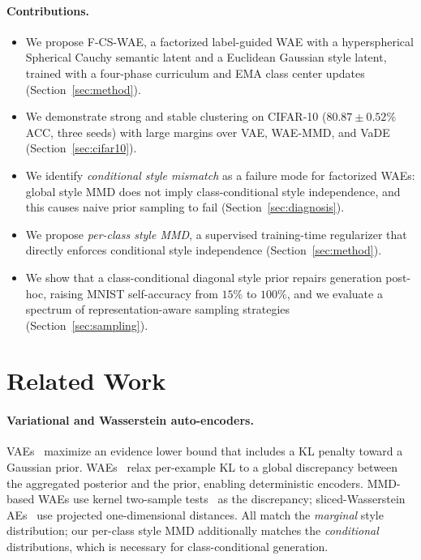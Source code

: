 \documentclass[10pt]{article}
\newcommand{\ours}{F-CS-WAE}
\begin{document}
\paragraph{Contributions.}
\begin{itemize}
  \item We propose \ours{}, a factorized label-guided WAE with a hyperspherical
        Spherical Cauchy semantic latent and a Euclidean Gaussian style latent,
        trained with a four-phase curriculum and EMA class center updates
        (Section~\ref{sec:method}).
  \item We demonstrate strong and stable clustering on CIFAR-10
        ($80.87\pm0.52\%$ ACC, three seeds) with large margins over
        VAE, WAE-MMD, and VaDE (Section~\ref{sec:cifar10}).
  \item We identify \emph{conditional style mismatch} as a failure mode for
        factorized WAEs: global style MMD does not imply class-conditional style
        independence, and this causes naive prior sampling to fail
        (Section~\ref{sec:diagnosis}).
  \item We propose \emph{per-class style MMD}, a supervised training-time
        regularizer that directly enforces conditional style independence
        (Section~\ref{sec:method}).
  \item We show that a class-conditional diagonal style prior repairs generation
        post-hoc, raising MNIST self-accuracy from $15\%$ to $100\%$, and we
        evaluate a spectrum of representation-aware sampling strategies
        (Section~\ref{sec:sampling}).
\end{itemize}

\section{Related Work}

\paragraph{Variational and Wasserstein auto-encoders.}
VAEs~\citep{kingma2013autoencoding} maximize an evidence lower bound that includes a
KL penalty toward a Gaussian prior.
WAEs~\citep{tolstikhin2017wasserstein} relax per-example KL to a global discrepancy
between the aggregated posterior and the prior, enabling deterministic encoders.
MMD-based WAEs use kernel two-sample tests~\citep{gretton2012kernel} as the
discrepancy; sliced-Wasserstein AEs~\citep{kolouri2018sliced} use projected
one-dimensional distances.
All match the \emph{marginal} style distribution; our per-class style MMD
additionally matches the \emph{conditional} distributions, which is necessary for
class-conditional generation.
\end{document}
